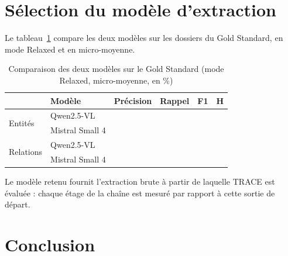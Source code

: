 \section{Sélection du modèle d'extraction}\label{sec:c4-selection}

Le tableau~\ref{tab:c4-comparaison} compare les deux modèles sur les  dossiers du Gold Standard, en mode Relaxed et en micro-moyenne.

\begin{table}[H]
\centering
\caption{Comparaison des deux modèles sur le Gold Standard (mode Relaxed, micro-moyenne, en \%)}\label{tab:c4-comparaison}
\small
\begin{tabular}{llcccc}
\toprule
& \textbf{Modèle} & \textbf{Précision} & \textbf{Rappel} & \textbf{F1} & \textbf{H} \\
\midrule
\multirow{2}{*}{Entités} & Qwen2.5-VL & \acompleter{} & \acompleter{} & \acompleter{} & \acompleter{} \\
 & Mistral Small 4 & \acompleter{} & \acompleter{} & \acompleter{} & \acompleter{} \\
\midrule
\multirow{2}{*}{Relations} & Qwen2.5-VL & \acompleter{} & \acompleter{} & \acompleter{} & \acompleter{} \\
 & Mistral Small 4 & \acompleter{} & \acompleter{} & \acompleter{} & \acompleter{} \\
\bottomrule
\end{tabular}
\end{table}


 Le modèle retenu fournit l'extraction brute à partir de laquelle TRACE est évaluée : chaque étage de la chaîne est mesuré par rapport à cette sortie de départ.

\section{Conclusion}\label{sec:c4-conclusion}

